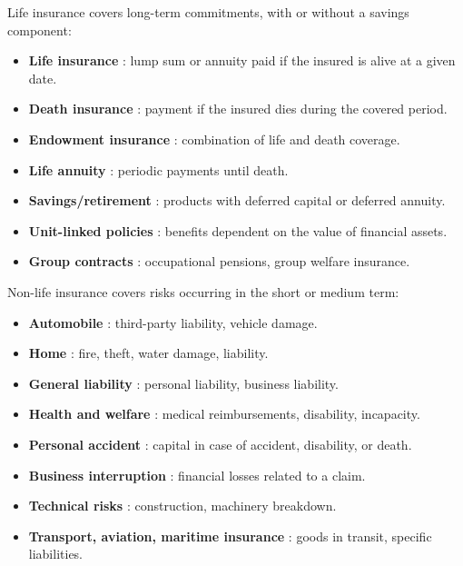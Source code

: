 \begin{f}
	
	Life insurance covers long-term commitments, with or without a savings component:
	\begin{itemize}[nosep]
		\item \textbf{Life insurance} : lump sum or annuity paid if the insured is alive at a given date.
		\item \textbf{Death insurance} : payment if the insured dies during the covered period.
		\item \textbf{Endowment insurance} : combination of life and death coverage.
		\item \textbf{Life annuity} : periodic payments until death.
		\item \textbf{Savings/retirement} : products with deferred capital or deferred annuity.
		\item \textbf{Unit-linked policies} : benefits dependent on the value of financial assets.
		\item \textbf{Group contracts} : occupational pensions, group welfare insurance.
	\end{itemize}
	
	
	Non-life insurance covers risks occurring in the short or medium term:
	\begin{itemize}[nosep]
		\item \textbf{Automobile} : third-party liability, vehicle damage.
		\item \textbf{Home} : fire, theft, water damage, liability.
		\item \textbf{General liability} : personal liability, business liability.
		\item \textbf{Health and welfare} : medical reimbursements, disability, incapacity.
		\item \textbf{Personal accident} : capital in case of accident, disability, or death.
		\item \textbf{Business interruption} : financial losses related to a claim.
		\item \textbf{Technical risks} : construction, machinery breakdown.
		\item \textbf{Transport, aviation, maritime insurance} : goods in transit, specific liabilities.
	\end{itemize}
	

\end{f}
